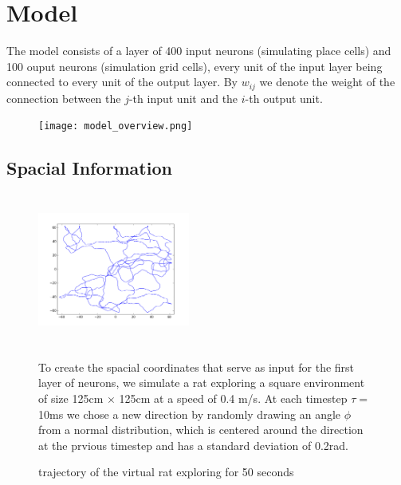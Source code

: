 \documentclass[a4paper, 12pt]{article}
\begin{document}
\section{Model}
The model consists of a layer of 400 input neurons (simulating place cells) and 100 ouput neurons (simulation grid cells), every unit of the input layer being connected to every unit of the output layer. By $w_{ij}$ we denote the weight of the connection between the $j$-th input unit and the $i$-th output unit. 
\begin{figure}
\texttt{[image: model\_overview.png]}
\end{figure}
\subsection{Spacial Information}
\begin{figure}[h]
\begin{minipage}{0.5\textwidth}
	\includegraphics[width=5cm, height=5cm]{running_rat.png}
	\caption{\footnotesize{trajectory of the virtual rat exploring for 50 seconds}}
\end{minipage}
\begin{minipage}{0.5\textwidth}
To create the spacial coordinates that serve as input for the first layer of neurons, we simulate a rat exploring a square environment of size 125cm $\times$ 125cm at a speed of 0.4 m/s. At each timestep $\tau=$10ms we chose a new direction by randomly drawing an angle $\phi$ from a normal distribution, which is centered around the direction at the prvious timestep and has a standard deviation of 0.2rad.   
\end{minipage}
\end{figure}
\end{document}
